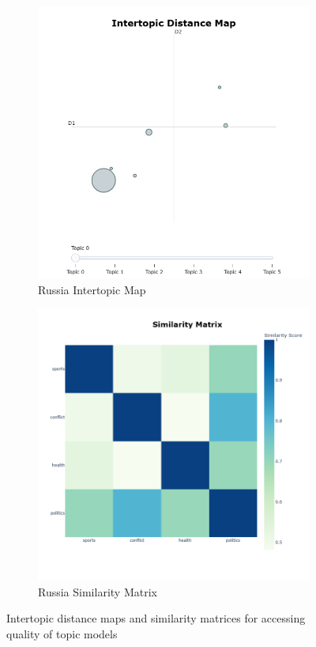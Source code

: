 \documentclass{article}
\theoremstyle{mytheoremstyle}
\theoremstyle{mytheoremstyle}
\theoremstyle{myproblemstyle}
\begin{document}
\begin{figure}[hp]
        \begin{subfigure}{0.45\textwidth}
            \includegraphics[width=\textwidth]{intertopic_distance_map_russia.png}
            \caption{Russia Intertopic Map}
            \label{fig:intertopic_russia}
        \end{subfigure}
        \hfill
        \begin{subfigure}{0.45\textwidth}
            \includegraphics[width=\textwidth]{similarity_matrix_russia.png}
            \caption{Russia Similarity Matrix}
            \label{fig:sim_russia}
        \end{subfigure}
                
        \caption{Intertopic distance maps and similarity matrices for accessing quality of topic models}
        \label{fig:topic_model_quality}
    \end{figure}
\end{document}
